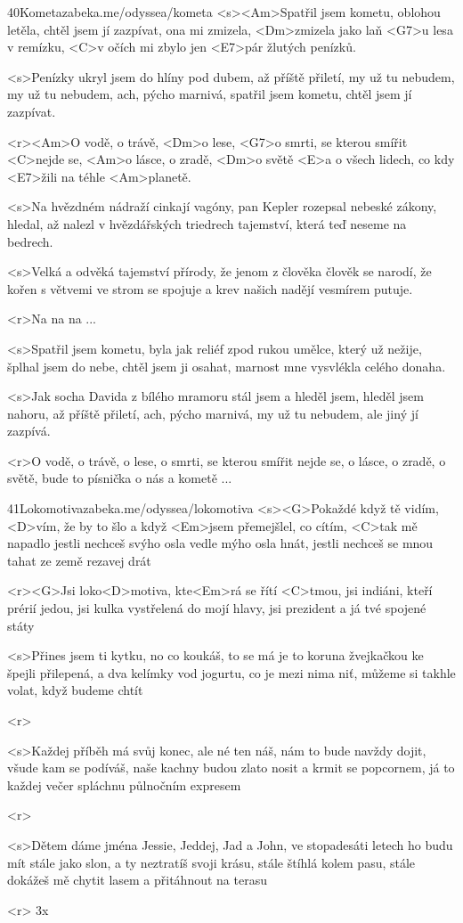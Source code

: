 \begin{song}{40}{Kometa}{zabeka.me/odyssea/kometa}
	<s><Am>Spatřil jsem kometu, oblohou letěla,
	chtěl jsem jí zazpívat, ona mi zmizela,
	<Dm>zmizela jako laň <G7>u lesa v remízku,
	<C>v očích mi zbylo jen <E7>pár žlutých penízků.

	<s>Penízky ukryl jsem do hlíny pod dubem,
	až příště přiletí, my už tu nebudem,
	my už tu nebudem, ach, pýcho marnivá,
	spatřil jsem kometu, chtěl jsem jí zazpívat.

	<r><Am>O vodě, o trávě, <Dm>o lese,
	<G7>o smrti, se kterou smířit <C>nejde se,
	<Am>o lásce, o zradě, <Dm>o světě
	<E>a o všech lidech, co kdy <E7>žili na téhle <Am>planetě.

	<s>Na hvězdném nádraží cinkají vagóny,
	pan Kepler rozepsal nebeské zákony,
	hledal, až nalezl v hvězdářských triedrech
	tajemství, která teď neseme na bedrech.

	<s>Velká a odvěká tajemství přírody,
	že jenom z člověka člověk se narodí,
	že kořen s větvemi ve strom se spojuje
	a krev našich nadějí vesmírem putuje.

	<r>Na na na ...

	<s>Spatřil jsem kometu, byla jak reliéf
	zpod rukou umělce, který už nežije,
	šplhal jsem do nebe, chtěl jsem ji osahat,
	marnost mne vysvlékla celého donaha.

	<s>Jak socha Davida z bílého mramoru
	stál jsem a hleděl jsem, hleděl jsem nahoru,
	až příště přiletí, ach, pýcho marnivá,
	my už tu nebudem, ale jiný jí zazpívá.

	<r>O vodě, o trávě, o lese,
	o smrti, se kterou smířit nejde se,
	o lásce, o zradě, o světě,
	bude to písnička o nás a kometě ...
\end{song}
\begin{song}[Poletíme?]{41}{Lokomotiva}{zabeka.me/odyssea/lokomotiva}
	<s><G>Pokaždé když tě vidím, <D>vím, že by to šlo
	a když <Em>jsem přemejšlel, co cítím, <C>tak mě napadlo
	jestli nechceš svýho osla vedle mýho osla hnát,
	jestli nechceš se mnou tahat ze země rezavej drát

	<r><G>Jsi loko<D>motiva, kte<Em>rá se řítí <C>tmou,
	jsi indiáni, kteří prérií jedou,
	jsi kulka vystřelená do mojí hlavy,
	jsi prezident a já tvé spojené státy

	<s>Přines jsem ti kytku, no co koukáš, to se má
	je to koruna žvejkačkou ke špejli přilepená,
	a dva kelímky vod jogurtu, co je mezi nima niť,
	můžeme si takhle volat, když budeme chtít

	<r>

	<s>Každej příběh má svůj konec, ale né ten náš,
	nám to bude navždy dojit, všude kam se podíváš,
	naše kachny budou zlato nosit a krmit se popcornem,
	já to každej večer spláchnu půlnočním expresem

	<r>

	<s>Dětem dáme jména Jessie, Jeddej, Jad a John,
	ve stopadesáti letech ho budu mít stále jako slon,
	a ty neztratíš svoji krásu, stále štíhlá kolem pasu,
	stále dokážeš mě chytit lasem a přitáhnout na terasu

	<r>
	3x

\end{song}
